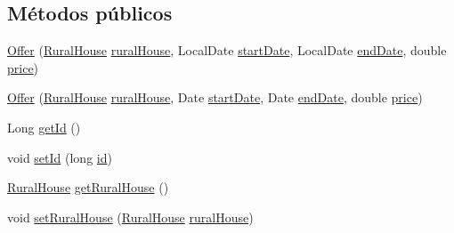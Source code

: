 \subsection*{Métodos públicos}
\begin{DoxyCompactItemize}
\item 
\mbox{\hyperlink{classcom_1_1ruralhousejsf_1_1domain_1_1_offer_ac2559262a3321b69ab5abb4ae28ade81}{Offer}} (\mbox{\hyperlink{classcom_1_1ruralhousejsf_1_1domain_1_1_rural_house}{Rural\+House}} \mbox{\hyperlink{classcom_1_1ruralhousejsf_1_1domain_1_1_offer_a87036858904c59c964d2c75137a97323}{rural\+House}}, Local\+Date \mbox{\hyperlink{classcom_1_1ruralhousejsf_1_1domain_1_1_offer_a3c4e8f6eb72413f6f76b1e4b05404ea8}{start\+Date}}, Local\+Date \mbox{\hyperlink{classcom_1_1ruralhousejsf_1_1domain_1_1_offer_a315f9b97f02da79a97fa489db212b5ce}{end\+Date}}, double \mbox{\hyperlink{classcom_1_1ruralhousejsf_1_1domain_1_1_offer_a2106c38f0c490e3263b1364c3ac56b0a}{price}})
\item 
\mbox{\hyperlink{classcom_1_1ruralhousejsf_1_1domain_1_1_offer_a9e313baa59c91681f9b88a91a3254b65}{Offer}} (\mbox{\hyperlink{classcom_1_1ruralhousejsf_1_1domain_1_1_rural_house}{Rural\+House}} \mbox{\hyperlink{classcom_1_1ruralhousejsf_1_1domain_1_1_offer_a87036858904c59c964d2c75137a97323}{rural\+House}}, Date \mbox{\hyperlink{classcom_1_1ruralhousejsf_1_1domain_1_1_offer_a3c4e8f6eb72413f6f76b1e4b05404ea8}{start\+Date}}, Date \mbox{\hyperlink{classcom_1_1ruralhousejsf_1_1domain_1_1_offer_a315f9b97f02da79a97fa489db212b5ce}{end\+Date}}, double \mbox{\hyperlink{classcom_1_1ruralhousejsf_1_1domain_1_1_offer_a2106c38f0c490e3263b1364c3ac56b0a}{price}})
\item 
Long \mbox{\hyperlink{classcom_1_1ruralhousejsf_1_1domain_1_1_offer_aebea4d12647f454b017ef7102b70fd90}{get\+Id}} ()
\item 
void \mbox{\hyperlink{classcom_1_1ruralhousejsf_1_1domain_1_1_offer_a470323b09c0c64417eb21c748d008045}{set\+Id}} (long \mbox{\hyperlink{classcom_1_1ruralhousejsf_1_1domain_1_1_offer_aba6516f5b9bb2dbe5d8b99404335adfc}{id}})
\item 
\mbox{\hyperlink{classcom_1_1ruralhousejsf_1_1domain_1_1_rural_house}{Rural\+House}} \mbox{\hyperlink{classcom_1_1ruralhousejsf_1_1domain_1_1_offer_a431afac3e582055bb908b715f2d22bdd}{get\+Rural\+House}} ()
\item 
void \mbox{\hyperlink{classcom_1_1ruralhousejsf_1_1domain_1_1_offer_ab10c2d200d23aff2383f720b1dcecd02}{set\+Rural\+House}} (\mbox{\hyperlink{classcom_1_1ruralhousejsf_1_1domain_1_1_rural_house}{Rural\+House}} \mbox{\hyperlink{classcom_1_1ruralhousejsf_1_1domain_1_1_offer_a87036858904c59c964d2c75137a97323}{rural\+House}})

\end{DoxyCompactItemize}

